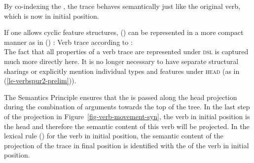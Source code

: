 {{By co-indexing the \contvs, the trace behaves semantically just like the original verb, which is
now in initial position.

If one allows cyclic feature structures, () can be represented in a more compact manner
as in () \citep[]{Meurers2000b}:  
\eas
\label{le-verbspur2}
Verb trace according to :\\
\zs
The fact that all \local properties of a verb trace are represented under \textsc{dsl} is captured much
more directly here. It is no longer necessary to have separate structural sharings or explicitly mention individual types and features
under \textsc{head} (as in (\ref{le-verbspur2-prelim})).

The Semantics Principle ensures that the \contv is passed along the head projection during the combination of arguments towards the top of the tree. 
In the last step of the projection in Figure~\ref{fig-verb-movement-syn}, the verb in initial position is the head and therefore the semantic
content of this verb will be projected. In the lexical rule () for the verb in initial position, 
the semantic content of the projection of the trace in final position  is identified with the 
\contv of the verb in initial position.


}}
